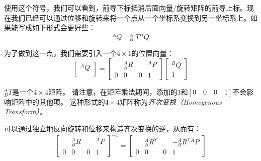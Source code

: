使用这个符号，我们可以看到，前导下标抵消后面向量/旋转矩阵的前导上标。现在我们已经可以通过位移和旋转来将一个点从一个坐标系变换到另一坐标系上。如果能写成如下形式会更好些：
\begin{equation}
^AQ=^A_BT^BQ
\end{equation}

为了做到这一点，我们需要引入一个$4\times1$的位置向量：
\begin{equation}
\left[\begin{array}{c}^AQ\\\end{array}\right]=\left[\begin{array}{ccc|c} & ^A_BR & & ^AP \\\hline 0 & 0 & 0 & 1\end{array}\right]\left[\begin{array}{c}^BQ\\1\end{array}\right]
\end{equation}

$^A_BT$是一个$4\times 4$矩阵。 请注意，在矩阵乘法期间，添加的$1$和$[0\quad 0\quad 0\quad 1]$不会影响矩阵中的其他项。 这种形式的$4\times 4$矩阵称为\emph{齐次变换（Homogenous Transform）}。


可以通过独立地反向旋转和位移来构造齐次变换的逆，从而有：
\begin{equation}
\left[\begin{array}{ccc|c} & ^A_BR & & ^AP \\\hline 0 & 0 & 0 & 1\end{array}\right]^{-1}=
\left[\begin{array}{ccc|c} & ^A_BR^T & & -^A_B{R^T}{^AP} \\\hline 0 & 0 & 0 & 1\end{array}\right]
\end{equation}


